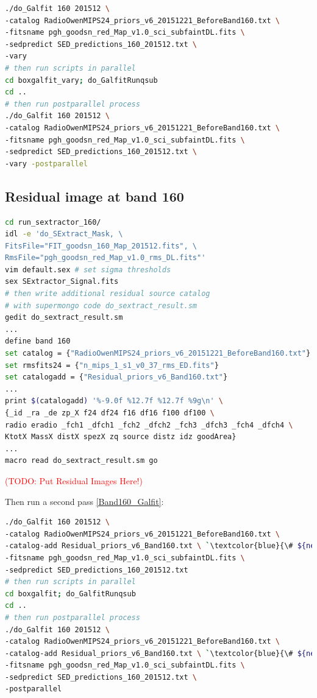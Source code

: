 \documentclass[11pt,a4paper]{article}
\begin{document}
\begin{lstlisting}[language=bash]
./do_Galfit 160 201512 \
-catalog RadioOwenMIPS24_priors_v6_20151221_BeforeBand160.txt \
-fitsname pgh_goodsn_red_Map_v1.0_sci_subfaintDL.fits \
-sedpredict SED_predictions_160_201512.txt \
-vary
# then run scripts in parallel 
cd boxgalfit_vary; do_GalfitRunqsub
cd ..
# then run postparallel process
./do_Galfit 160 201512 \
-catalog RadioOwenMIPS24_priors_v6_20151221_BeforeBand160.txt \
-fitsname pgh_goodsn_red_Map_v1.0_sci_subfaintDL.fits \
-sedpredict SED_predictions_160_201512.txt \
-vary -postparallel
\end{lstlisting}

\subsection{Residual image at band 160}
\label{Band160_Galres}

\begin{lstlisting}[language=bash]
cd run_sextractor_160/
idl -e 'do_SExtract_Mask, \
FitsFile="FIT_goodsn_160_Map_201512.fits", \
RmsFile="pgh_goodsn_red_Map_v1.0_rms_DL.fits"'
vim default.sex # set sigma thresholds
sex SExtractor_Signal.fits
# then write additional residual source catalog
# with supermongo code do_sextract_result.sm
gedit do_sextract_result.sm
...
define band 160
set catalog = {"RadioOwenMIPS24_priors_v6_20151221_BeforeBand160.txt"}
set rmsfits24 = {"n_mips_1_s1_v0_37_rms_ED.fits"}
set catalogadd = {"Residual_priors_v6_Band160.txt"}
...
print $(catalogadd) '%-9.0f %12.7f %12.7f %9g\n' \
{_id _ra _de zp_X f24 df24 f16 df16 f100 df100 \
radio eradio _fch1 _dfch1 _fch2 _dfch2 _fch3 _dfch3 _fch4 _dfch4 \
KtotX MassX distX spezX zq source distz idz goodArea}
...
macro read do_sextract_result.sm go
\end{lstlisting}

\textcolor{red}{(TODO: Put Residual Images Here!)}

Then run a second pass \ref{Band160_Galfit}: 

\begin{lstlisting}[language=bash]
./do_Galfit 160 201512 \
-catalog RadioOwenMIPS24_priors_v6_20151221_BeforeBand160.txt \
-catalog-add Residual_priors_v6_Band160.txt \ `\textcolor{blue}{\# ${new!}$}`
-fitsname pgh_goodsn_red_Map_v1.0_sci_subfaintDL.fits \
-sedpredict SED_predictions_160_201512.txt
# then run scripts in parallel 
cd boxgalfit; do_GalfitRunqsub
cd ..
# then run postparallel process
./do_Galfit 160 201512 \
-catalog RadioOwenMIPS24_priors_v6_20151221_BeforeBand160.txt \
-catalog-add Residual_priors_v6_Band160.txt \ `\textcolor{blue}{\# ${new!}$}`
-fitsname pgh_goodsn_red_Map_v1.0_sci_subfaintDL.fits \
-sedpredict SED_predictions_160_201512.txt \
-postparallel
\end{lstlisting}
\end{document}
